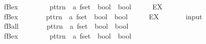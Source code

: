 \begin{isabellebody}
\ \ {\isachardoublequoteopen}{\isacharunderscore}fBex{\isachardoublequoteclose}\ \ \ \ \ \ \ \ {\isacharcolon}{\isacharcolon}\ {\isachardoublequoteopen}pttrn\ {\isasymRightarrow}\ {\isacharprime}a\ fset\ {\isasymRightarrow}\ bool\ {\isasymRightarrow}\ bool{\isachardoublequoteclose}\ \ \ \ \ \ {\isacharparenleft}{\isachardoublequoteopen}{\isacharparenleft}{}EX\ {\isacharparenleft}{\isacharunderscore}{\isacharslash}{\isacharcolon}{\isacharunderscore}{\isacharparenright}{\isachardot}{\isacharslash}\ {\isacharunderscore}{\isacharparenright}{\isachardoublequoteclose}\ {\isacharbrackleft}{}{\isacharcomma}\ {}{\isacharcomma}\ {}{}{\isacharbrackright}\ {}{}{\isacharparenright}\isanewline
\ \ {\isachardoublequoteopen}{\isacharunderscore}fBex{}{\isachardoublequoteclose}\ \ \ \ \ \ \ {\isacharcolon}{\isacharcolon}\ {\isachardoublequoteopen}pttrn\ {\isasymRightarrow}\ {\isacharprime}a\ fset\ {\isasymRightarrow}\ bool\ {\isasymRightarrow}\ bool{\isachardoublequoteclose}\ \ \ \ \ \ {\isacharparenleft}{\isachardoublequoteopen}{\isacharparenleft}{}EX{\isacharbang}\ {\isacharparenleft}{\isacharunderscore}{\isacharslash}{\isacharcolon}{\isacharunderscore}{\isacharparenright}{\isachardot}{\isacharslash}\ {\isacharunderscore}{\isacharparenright}{\isachardoublequoteclose}\ {\isacharbrackleft}{}{\isacharcomma}\ {}{\isacharcomma}\ {}{}{\isacharbrackright}\ {}{}{\isacharparenright}\isanewline
\isanewline
{}\isamarkupfalse%
\ {\isacharparenleft}input{\isacharparenright}\isanewline
\ \ {\isachardoublequoteopen}{\isacharunderscore}fBall{\isachardoublequoteclose}\ \ \ \ \ \ \ {\isacharcolon}{\isacharcolon}\ {\isachardoublequoteopen}pttrn\ {\isasymRightarrow}\ {\isacharprime}a\ fset\ {\isasymRightarrow}\ bool\ {\isasymRightarrow}\ bool{\isachardoublequoteclose}\ \ \ \ \ \ {\isacharparenleft}{\isachardoublequoteopen}{\isacharparenleft}{}{\isacharbang}\ {\isacharparenleft}{\isacharunderscore}{\isacharslash}{\isacharcolon}{\isacharunderscore}{\isacharparenright}{\isachardot}{\isacharslash}\ {\isacharunderscore}{\isacharparenright}{\isachardoublequoteclose}\ {\isacharbrackleft}{}{\isacharcomma}\ {}{\isacharcomma}\ {}{}{\isacharbrackright}\ {}{}{\isacharparenright}\isanewline
\ \ {\isachardoublequoteopen}{\isacharunderscore}fBex{\isachardoublequoteclose}\ \ \ \ \ \ \ \ {\isacharcolon}{\isacharcolon}\ {\isachardoublequoteopen}pttrn\ {\isasymRightarrow}\ {\isacharprime}a\ fset\ {\isasymRightarrow}\ bool\ {\isasymRightarrow}\ bool{\isachardoublequoteclose}\ \ \ \ \ \ {\isacharparenleft}{\isachardoublequoteopen}{\isacharparenleft}{}{\isacharquery}\ {\isacharparenleft}{\isacharunderscore}{\isacharslash}{\isacharcolon}{\isacharunderscore}{\isacharparenright}{\isachardot}{\isacharslash}\ {\isacharunderscore}{\isacharparenright}{\isachardoublequoteclose}\ {\isacharbrackleft}{}{\isacharcomma}\ {}{\isacharcomma}\ {}{}{\isacharbrackright}\ {}{}{\isacharparenright}\isanewline

\end{isabellebody}

